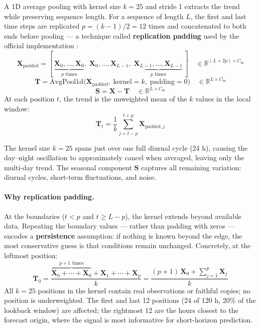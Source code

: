 \documentclass[12pt,a4paper,oneside]{report}
\begin{document}
A 1D average pooling with kernel size $k = 25$ and stride 1 extracts the trend
while preserving sequence length. For a sequence of length $L$, the first and
last time steps are replicated $p = (k-1)/2 = 12$ times and concatenated to both
ends before pooling --- a technique called \textbf{replication padding} used by
the official implementation \citep{zeng2023dlinear}:
%
\begin{equation}
\mathbf{X}_{\text{padded}} = [\,\underbrace{\mathbf{X}_0, \ldots, \mathbf{X}_0}_{p \text{ times}},\;
        \mathbf{X}_0, \ldots, \mathbf{X}_{L-1},\;
        \underbrace{\mathbf{X}_{L-1}, \ldots, \mathbf{X}_{L-1}}_{p \text{ times}}\,]
        \quad \in \mathbb{R}^{(L + 2p) \times C_{\text{in}}}
\end{equation}
%
\begin{equation}
\mathbf{T} = \text{AvgPool1d}\big(\mathbf{X}_{\text{padded}},\;
            \text{kernel}=k,\; \text{padding}=0\big)
            \quad \in \mathbb{R}^{L \times C_{\text{in}}}
\end{equation}
%
\begin{equation}
\mathbf{S} = \mathbf{X} - \mathbf{T} \quad \in \mathbb{R}^{L \times C_{\text{in}}}
\end{equation}
%
At each position $t$, the trend is the unweighted mean of the $k$ values in the
local window:
%
\begin{equation}
\mathbf{T}_t = \frac{1}{k} \sum_{j=t-p}^{t+p} \mathbf{X}_{\text{padded}, j}
\end{equation}

The kernel size $k=25$ spans just over one full diurnal cycle (24 h), causing
the day--night oscillation to approximately cancel when averaged, leaving only
the multi-day trend. The seasonal component $\mathbf{S}$ captures all remaining
variation: diurnal cycles, short-term fluctuations, and noise.

\paragraph{Why replication padding.}
At the boundaries ($t < p$ and $t \ge L-p$), the kernel extends beyond available
data. Repeating the boundary values --- rather than padding with zeros ---
encodes a \textbf{persistence} assumption: if nothing is known beyond the edge,
the most conservative guess is that conditions remain unchanged. Concretely, at
the leftmost position:
%
\begin{equation}
\mathbf{T}_0 = \frac{\overbrace{\mathbf{X}_0 + \cdots + \mathbf{X}_0}^{p+1 \text{ times}}
        + \mathbf{X}_1 + \cdots + \mathbf{X}_p}{k}
        = \frac{(p+1)\,\mathbf{X}_0 + \sum_{j=1}^{p} \mathbf{X}_j}{k}
\end{equation}
%
All $k=25$ positions in the kernel contain real observations or faithful copies;
no position is underweighted. The first and last 12 positions (24 of 120 h, 20\%
of the lookback window) are affected; the rightmost 12 are the hours closest to
the forecast origin, where the signal is most informative for short-horizon
prediction.
\end{document}
